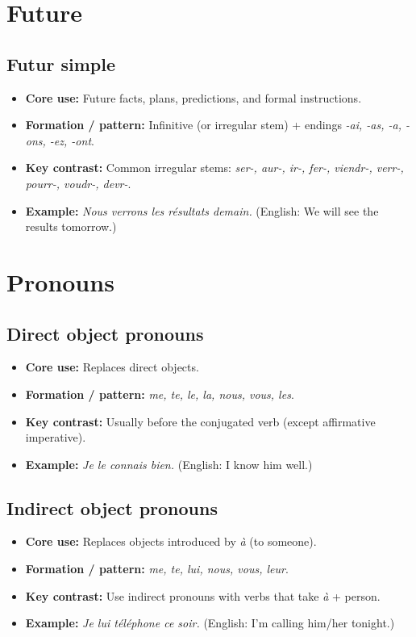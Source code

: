 \documentclass{article}
\begin{document}
\section{Future}

\subsection{Futur simple}
\begin{itemize}
    \item \textbf{Core use:} Future facts, plans, predictions, and formal instructions.
    \item \textbf{Formation / pattern:} Infinitive (or irregular stem) + endings \textit{-ai, -as, -a, -ons, -ez, -ont}.
    \item \textbf{Key contrast:} Common irregular stems: \textit{ser-, aur-, ir-, fer-, viendr-, verr-, pourr-, voudr-, devr-}.
    \item \textbf{Example:} \textit{Nous verrons les résultats demain.} (English: We will see the results tomorrow.)
\end{itemize}

\section{Pronouns}

\subsection{Direct object pronouns}
\begin{itemize}
    \item \textbf{Core use:} Replaces direct objects.
    \item \textbf{Formation / pattern:} \textit{me, te, le, la, nous, vous, les}.
    \item \textbf{Key contrast:} Usually before the conjugated verb (except affirmative imperative).
    \item \textbf{Example:} \textit{Je le connais bien.} (English: I know him well.)
\end{itemize}

\subsection{Indirect object pronouns}
\begin{itemize}
    \item \textbf{Core use:} Replaces objects introduced by \textit{à} (to someone).
    \item \textbf{Formation / pattern:} \textit{me, te, lui, nous, vous, leur}.
    \item \textbf{Key contrast:} Use indirect pronouns with verbs that take \textit{à} + person.
    \item \textbf{Example:} \textit{Je lui téléphone ce soir.} (English: I'm calling him/her tonight.)
\end{itemize}
\end{document}
